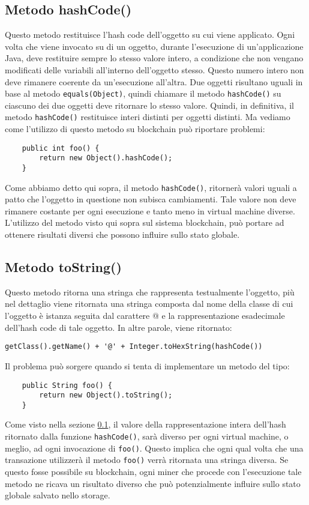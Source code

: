 		\subsection{Metodo hashCode()}
		\label{object-hashcode}
			Questo metodo restituisce l'hash code dell'oggetto su cui viene applicato. Ogni volta che viene invocato su di un oggetto, durante l'esecuzione di un'applicazione Java, deve restituire sempre lo stesso valore intero, a condizione che non vengano modificati delle variabili all'interno dell'oggetto stesso. Questo numero intero non deve rimanere coerente da un'esecuzione all'altra. Due oggetti risultano uguali in base al metodo \lstinline|equals(Object)|, quindi chiamare il metodo \lstinline|hashCode()| su ciascuno dei due oggetti deve ritornare lo stesso valore. Quindi, in definitiva, il metodo \lstinline|hashCode()| restituisce interi distinti per oggetti distinti. Ma vediamo come l'utilizzo di questo metodo su blockchain può riportare problemi:
			\begin{lstlisting}
	public int foo() {
		return new Object().hashCode();
	}
			\end{lstlisting}
			Come abbiamo detto qui sopra, il metodo \lstinline|hashCode()|, ritornerà valori uguali a patto che l'oggetto in questione non subisca cambiamenti. Tale valore non deve rimanere costante per ogni esecuzione e tanto meno in virtual machine diverse. L'utilizzo del metodo visto qui sopra sul sistema blockchain, può portare ad ottenere risultati diversi che possono influire sullo stato globale.
			
		\subsection{Metodo toString()}
			Questo metodo ritorna una stringa che rappresenta testualmente l'oggetto, più nel dettaglio viene ritornata una stringa composta dal nome della classe di cui l'oggetto è istanza seguita dal carattere @ e la rappresentazione esadecimale dell'hash code di tale oggetto. In altre parole, viene ritornato:
			\begin{lstlisting}[numbers=none,frame=none]
	getClass().getName() + '@' + Integer.toHexString(hashCode())
				\end{lstlisting}
			Il problema può sorgere quando si tenta di implementare un metodo del tipo:
			\begin{lstlisting}
	public String foo() {
		return new Object().toString();
	}
			\end{lstlisting}
			Come visto nella sezione \ref{object-hashcode}, il valore della rappresentazione intera dell'hash ritornato dalla funzione \lstinline|hashCode()|, sarà diverso per ogni virtual machine, o meglio, ad ogni invocazione di \lstinline|foo()|. Questo implica che ogni qual volta che una transazione utilizzerà il metodo \lstinline|foo()| verrà ritornata una stringa diversa. Se questo fosse possibile su blockchain, ogni miner che procede con l'esecuzione tale metodo ne ricava un risultato diverso che può potenzialmente influire sullo stato globale salvato nello storage.
	
